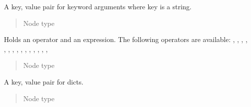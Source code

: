 \documentclass[a4paper,10pt,english]{sphinxmanual}
\begin{document}
\begin{fulllineitems}
\label{extensions:jinja2.nodes.Keyword}
A key, value pair for keyword arguments where key is a string.
\begin{quote}\begin{description}
\item[{Node type}] \leavevmode
{\hyperref[extensions:jinja2.nodes.Helper]{}}

\end{description}\end{quote}

\end{fulllineitems}


\begin{fulllineitems}
\label{extensions:jinja2.nodes.Operand}
Holds an operator and an expression.
The following operators are available: \code{\%}, \code{**}, \code{*}, \code{+}, \code{-}, \code{//}, \code{/}, , , , , , , , , 
\begin{quote}\begin{description}
\item[{Node type}] \leavevmode
{\hyperref[extensions:jinja2.nodes.Helper]{}}

\end{description}\end{quote}

\end{fulllineitems}


\begin{fulllineitems}
\label{extensions:jinja2.nodes.Pair}
A key, value pair for dicts.
\begin{quote}\begin{description}
\item[{Node type}] \leavevmode
{\hyperref[extensions:jinja2.nodes.Helper]{}}

\end{description}\end{quote}

\end{fulllineitems}
\end{document}
